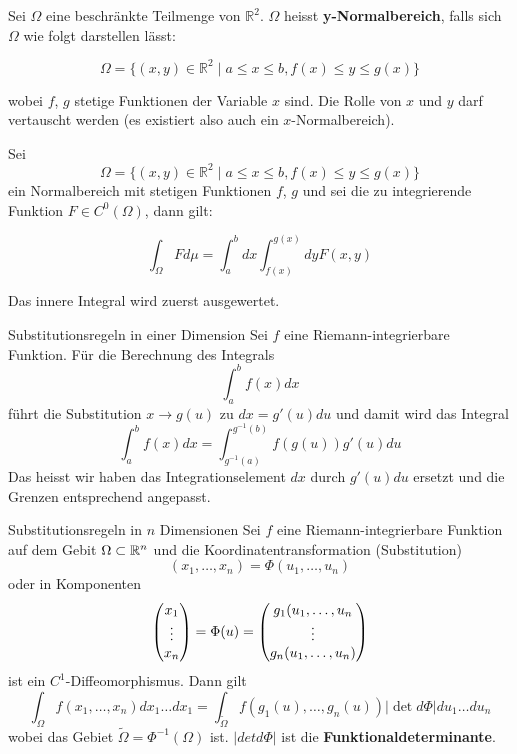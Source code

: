 Sei $\Omega$ eine beschränkte Teilmenge von $\mathbb{R}^2$. $\Omega$ heisst \textbf{y-Normalbereich}, falls sich $\Omega$ wie folgt darstellen lässt:

\[
    \Omega = \{(x, y) \in \mathbb{R}^2 \mid a \leq x \leq b, f(x) \leq y \leq g(x)\}
\]

wobei $f$, $g$ stetige Funktionen der Variable $x$ sind. Die Rolle von $x$ und $y$ darf vertauscht werden (es existiert also auch ein $x$-Normalbereich).

Sei \[\Omega = \{(x, y) \in \mathbb{R}^2 \mid a \leq x \leq b, f(x) \leq y \leq g(x)\}\] ein Normalbereich mit stetigen Funktionen $f$, $g$ und sei die zu integrierende Funktion $F \in C^0(\Omega)$, dann gilt:

\[
    \int_{\Omega} F d\mu = \int_a^b dx \int_{f(x)}^{g(x)} dy F(x, y)
\]

Das innere Integral wird zuerst ausgewertet.

\begin{Satz}{Substitutionsregeln in einer Dimension}{}
    Sei $f$ eine Riemann-integrierbare Funktion. Für die Berechnung des Integrals
    \[
        \int_a^b f(x) dx
    \]
    führt die Substitution $x \to g(u)$ zu $dx = g'(u)du$ und damit wird das Integral
    \[
        \int_a^b f(x) dx = \int_{g^{-1}(a)}^{g^{-1}(b)} f(g(u)) g'(u) du
    \]
    Das heisst wir haben das Integrationselement $dx$ durch $g'(u)du$ ersetzt und die Grenzen entsprechend angepasst.
\end{Satz}

\begin{Satz}{Substitutionsregeln in $n$ Dimensionen}{}
    Sei $f$ eine Riemann-integrierbare Funktion auf dem Gebit $\Omega \subset \mathbb{R}^n$ und die Koordinatentransformation (Substitution)
    \[
    (x_1,\hdots,x_n) = \Phi(u_1, \hdots,  u_n)
    \]
    oder in Komponenten
    \[
        \begin{pmatrix} x_1 \\ \vdots \\ x_n \end{pmatrix}
        = \Phi(u)
        = \begin{pmatrix} g_1(u_1,\hdots,u_n \\ \vdots \\ g_n(u_1,\hdots,u_n) \end{pmatrix}
    \]
    ist ein $C^1$-Diffeomorphismus. Dann gilt
    \[
        \int_\Omega f(x_1, \hdots, x_n)dx_1\hdots dx_1 = \int_{\widetilde{\Omega}} f(g_1(u), \hdots, g_n(u))|\det d \Phi | du_1\hdots du_n
    \]
    wobei das Gebiet $\widetilde{\Omega} = \Phi^{-1}(\Omega)$ ist. $|det d\Phi|$ ist die \textbf{Funktionaldeterminante}.
\end{Satz}

